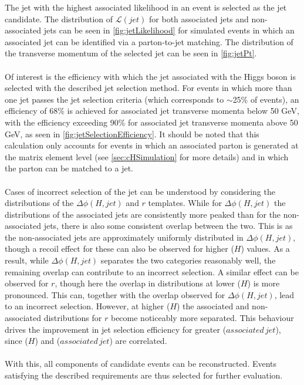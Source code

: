 The jet with the highest associated likelihood in an event is selected as the jet candidate. The distribution of $\mathcal{L}(jet)$ for both associated jets and non-associated jets can be seen in \autoref{fig:jetLikelihood} for simulated \cHZZsen events in which an associated jet can be identified via a parton-to-jet matching. The distribution of the transverse momentum of the selected jet can be seen in \autoref{fig:jetPt}.\\
\\
Of interest is the efficiency with which the jet associated with the Higgs boson is selected with the described jet selection method. For events in which more than one jet passes the jet selection criteria (which corresponds to $\sim$25\% of events), an efficiency of 68\% is achieved for associated jet transverse momenta below 50 GeV, with the efficiency exceeding 90\% for associated jet transverse momenta above 50 GeV, as seen in \autoref{fig:jetSelectionEfficiency}. It should be noted that this calculation only accounts for events in which an associated parton is generated at the matrix element level (see \autoref{sec:cHSimulation} for more details) and in which the parton can be matched to a jet. \\
\\
Cases of incorrect selection of the jet can be understood by considering the distributions of the $\Delta \phi(H, jet)$ and $r$ templates. While for $\Delta \phi(H, jet)$ the distributions of the associated jets are consistently more peaked than for the non-associated jets, there is also some consistent overlap between the two. This is as the non-associated jets are approximately uniformly distributed in $\Delta \phi(H, jet)$, though a recoil effect for these can also be observed for higher \pt($H$) values. As a result, while $\Delta \phi(H, jet)$ separates the two categories reasonably well, the remaining overlap can contribute to an incorrect selection. A similar effect can be observed for $r$, though here the overlap in distributions at lower \pt($H$) is more pronounced. This can, together with the overlap observed for $\Delta \phi(H, jet)$, lead to an incorrect selection. However, at higher \pt($H$) the associated and non-associated distributions for $r$ become noticeably more separated. This behaviour drives the improvement in jet selection efficiency for greater \pt($associated\,jet$), since \pt($H$) and \pt($associated\,jet$) are correlated. \\
\\
With this, all components of \cHZZ candidate events can be reconstructed. Events satisfying the described requirements are thus selected for further evaluation.

